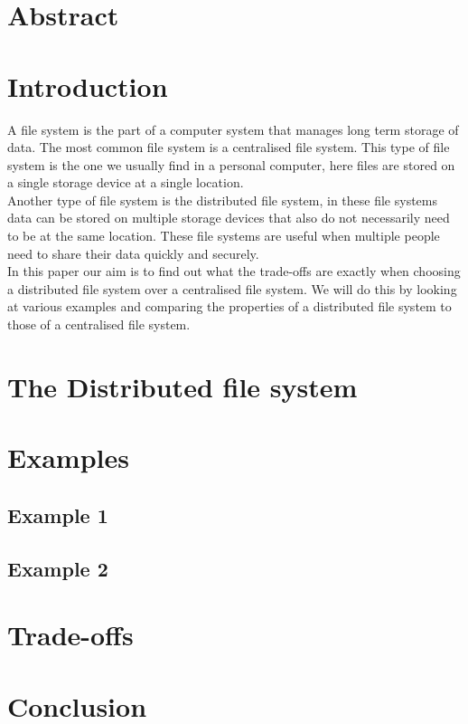 \documentclass[a4paper,12px]{article}
\begin{document}
\clearpage
\tableofcontents
\clearpage






\section{Abstract}

\section{Introduction}

A file system is the part of a computer system that manages long term storage of
data.  The most common file system is a centralised file system. This type of
file system is the one we usually find in a personal computer, here files are
stored on a single storage device at a single location.\\
Another type of file system is the distributed file system, in these file
systems data can be stored on multiple storage devices that also do not
necessarily need to be at the same location. These file systems are useful when
multiple people need to share their data quickly and securely.\\
In this paper our aim is to find out what the trade-offs are exactly  when
choosing a distributed file system over a centralised file system. We will do
this by looking at various examples and comparing the properties of a
distributed file system to those of a centralised file system.

\section{The Distributed file system}

\section{Examples}
\subsection{Example 1}
\subsection{Example 2}

\section{Trade-offs}

\section{Conclusion}




%
%
\end{document}
